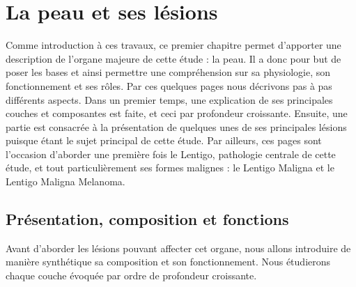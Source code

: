 \chapter{La peau et ses lésions}
\label{chap:chapter_1}
\chapterintro
Comme introduction à ces travaux, ce premier chapitre permet d'apporter une description de l'organe majeure de cette étude : la peau. Il a donc pour but de poser les bases et ainsi permettre une compréhension sur sa physiologie, son fonctionnement et ses rôles. Par ces quelques pages nous décrivons pas à pas différents aspects. Dans un premier temps, une explication de ses principales couches et composantes est faite, et ceci par profondeur croissante. Ensuite, une partie est consacrée à la présentation de quelques unes de ses principales lésions puisque étant le sujet principal de cette étude. Par ailleurs, ces pages sont l'occasion d'aborder une première fois le Lentigo, pathologie centrale de cette étude, et tout particulièrement ses formes malignes : le Lentigo Maligna et le Lentigo Maligna Melanoma.\par
\newpage

\section{Présentation, composition et fonctions}
Avant d’aborder les lésions pouvant affecter cet organe, nous allons introduire de manière synthétique sa composition et son fonctionnement. Nous étudierons chaque couche évoquée par ordre de profondeur croissante.\par

